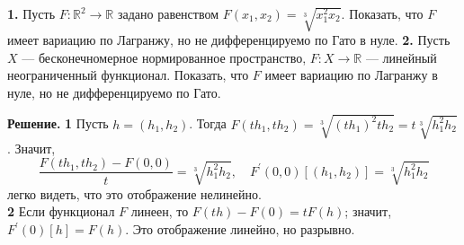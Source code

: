 \begin{task}
    \textbf{1.} Пусть $F: \mathbb{R}^2 \rightarrow \mathbb{R}$ задано равенством $F\left(x_1, x_2\right)=\sqrt[3]{x_1^2 x_2}$. 
    Показать, что $F$ имеет вариацию по Лагранжу, но не дифференцируемо по Гато в нуле. 
    \textbf{2.} Пусть $X$ --- бесконечномерное нормированное пространство, $F: X \rightarrow \mathbb{R}$ 
    --- линейный неограниченный функционал. Показать, что $F$ имеет вариацию по Лагранжу в нуле, 
    но не дифференцируемо по Гато.
    
    \textbf{Решение.} \textbf{1} Пусть $h = \left( h_1, h_2 \right)$. 
    Тогда $F\left(t h_1, t h_2\right)=\sqrt[3]{\left(t h_1\right)^{2} t h_2}=t \sqrt[3]{h_1^2 h_2}$. Значит,
    \[ 
    \frac{F\left(t h_1, t h_2\right)-F(0,0)}{t}=\sqrt[3]{h_1^2 h_2}, \quad F^{\prime}(0,0)\left[\left(h_1, h_2\right)\right]=\sqrt[3]{h_1^2 h_2}
    \]  
    легко видеть, что это отображение нелинейно.\\
    \textbf{2} Если функционал $F$ линеен, то $F(t h)-F(0)=t F(h)$; значит, $F^{\prime}(0)[h]=F(h)$. Это отображение линейно, но разрывно.
    
    \end{task}